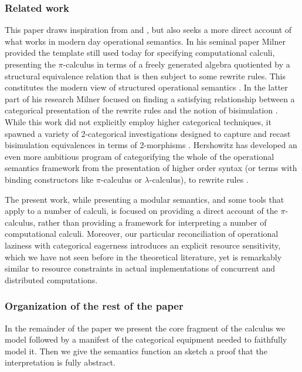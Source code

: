 \documentclass[]{acm_proc_article-sp}
\numberwithin{equation}{subsection}
\newcommand{\pic}{$\pi$-calculus}
\begin{document}
\subsubsection{Related work}


This paper draws inspiration from \cite{DBLP:conf/lics/Seely87} and
\cite{DBLP:journals/tcs/Hilken96}, but also seeks a more direct
account of what works in modern day operational semantics. In his
seminal paper \cite{DBLP:journals/mscs/Milner92} Milner provided the
template still used today for specifying computational calculi,
presenting the {\pic} in terms of a freely generated algebra
quotiented by a structural equivalence relation that is then subject
to some rewrite rules. This constitutes the modern view of structured
operational semantics \cite{Plotkin04theorigins}. In the latter part
of his research Milner focused on finding a satisfying relationship
between a categorical presentation of the rewrite rules and the notion
of bisimulation \cite{DBLP:conf/concur/LeiferM00}. While this work did
not explicitly employ higher categorical techniques, it spawned a
variety of 2-categorical investigations designed to capture and recast
bisimulation equivalences in terms of 2-morphisms
\cite{Sassone02derivingbisimulation}. Hershowitz has developed an even
more ambitious program of categorifying the whole of the operational
semantics framework from the presentation of higher order syntax (or
terms with binding constructors like {\pic} or $\lambda$-calculus), to
rewrite rules \cite{hirschowitzcc2c}.

The present work, while presenting a modular semantics, and some tools
that apply to a number of calculi, is focused on providing a direct
account of the {\pic}, rather than providing a framework for
interpreting a number of computational calculi. Moreover, our
particular reconciliation of operational laziness with categorical
eagerness introduces an explicit resource sensitivity, which we have
not seen before in the theoretical literature, yet is remarkably
similar to resource constraints in actual implementations of
concurrent and distributed computations.

\subsubsection{Organization of the rest of the paper}

In the remainder of the paper we present the core fragment of the
calculus we model followed by a manifest of the categorical equipment
needed to faithfully model it. Then we give the semantics function an
sketch a proof that the interpretation is fully abstract.
\end{document}
